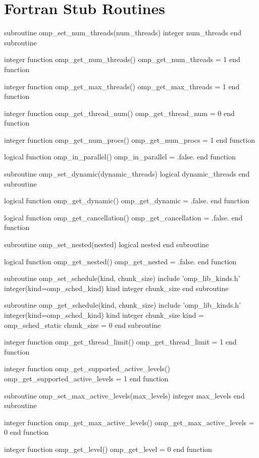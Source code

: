 \section{Fortran Stub Routines}
\label{sec:Fortran Stub Routines}
{\small \begin{ompfFunction}
subroutine omp_set_num_threads(num_threads)
  integer num_threads
end subroutine

integer function omp_get_num_threads()
  omp_get_num_threads = 1
end function

integer function omp_get_max_threads()
  omp_get_max_threads = 1
end function

integer function omp_get_thread_num()
  omp_get_thread_num = 0
end function

integer function omp_get_num_procs()
  omp_get_num_procs = 1
end function

logical function omp_in_parallel()
  omp_in_parallel = .false.
end function

subroutine omp_set_dynamic(dynamic_threads)
  logical dynamic_threads
end subroutine

logical function omp_get_dynamic()
  omp_get_dynamic = .false.
end function

logical function omp_get_cancellation()
  omp_get_cancellation = .false.
end function

subroutine omp_set_nested(nested)
  logical nested
end subroutine

logical function omp_get_nested()
  omp_get_nested = .false.
end function

subroutine omp_set_schedule(kind, chunk_size)
  include 'omp_lib_kinds.h'
  integer(kind=omp_sched_kind) kind
  integer chunk_size
end subroutine

subroutine omp_get_schedule(kind, chunk_size)
  include 'omp_lib_kinds.h'
  integer(kind=omp_sched_kind) kind
  integer chunk_size
  kind = omp_sched_static
  chunk_size = 0
end subroutine

integer function omp_get_thread_limit()
  omp_get_thread_limit = 1
end function

integer function omp_get_supported_active_levels()
  omp_get_supported_active_levels = 1
end function

subroutine omp_set_max_active_levels(max_levels)
  integer max_levels
end subroutine

integer function omp_get_max_active_levels()
  omp_get_max_active_levels = 0
end function

integer function omp_get_level()
  omp_get_level = 0
end function


\end{ompfFunction}}
